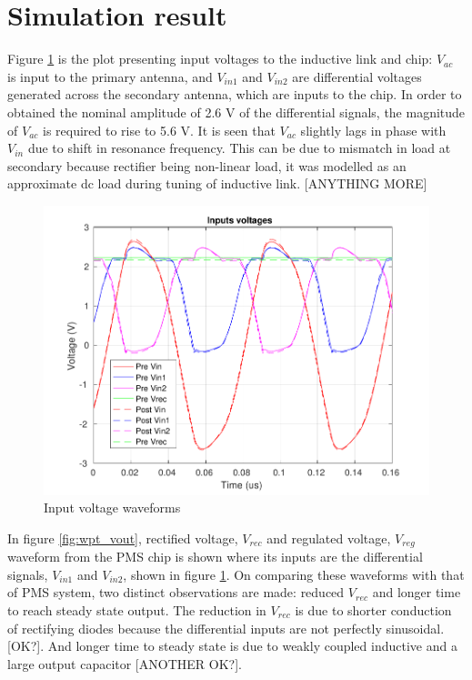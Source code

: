 \documentclass[UKenglish]{ifimaster}  %
\begin{document}
\section{Simulation result}	%
Figure \ref{fig:wpt_vin} is the plot presenting input voltages to the inductive link and chip: $V_{ac}$ is input to the 
primary antenna, and $V_{in1}$ and $V_{in2}$ are differential voltages generated across the secondary antenna, which are 
inputs to the chip. In order to obtained the nominal amplitude of 2.6 V of the differential signals, 
the magnitude of $V_{ac}$ is required to rise to 5.6 \si{\volt}. It is seen that $V_{ac}$ slightly lags in phase with $V_{in}$ due to shift 
in resonance frequency. This can be due to mismatch in load at secondary because rectifier being non-linear load, it was 
modelled as an approximate dc load during tuning of inductive link. [ANYTHING MORE]\\

\begin{figure} [H]
  \centering
  \includegraphics[width=\textwidth]{img/wpt/wpt_inputs_both.pdf} 
 \caption{Input voltage waveforms} 
\label{fig:wpt_vin} 
\end{figure}

In figure \ref{fig:wpt_vout}, rectified voltage, $V_{rec}$ and regulated voltage, $V_{reg}$ waveform from the PMS chip is 
shown where its inputs are the differential signals, $V_{in1}$ and $V_{in2}$, shown in figure \ref{fig:wpt_vin}. On 
comparing these waveforms with that of PMS system, two distinct observations are made: reduced $V_{rec}$ and longer time 
to reach steady state output. The reduction in $V_{rec}$ is due to shorter conduction of rectifying diodes because the 
differential inputs are not perfectly sinusoidal.[OK?]. And longer time to steady state is due to weakly coupled inductive 
and a large output capacitor [ANOTHER OK?].  
\end{document}
